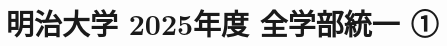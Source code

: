 \documentclass[../../uem_mei_q.tex]{subfiles}
\begin{document}
    \section{明治大学 2025年度 全学部統一 ①}
    \subsection{　}
        
        \clearpage
    \subsection{　}
        
        \clearpage
    \subsection{　}
        
\end{document}
